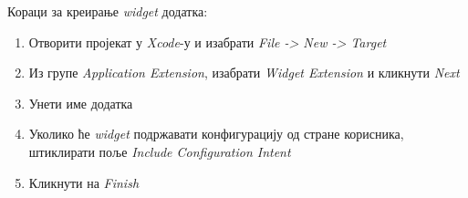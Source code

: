 \documentclass[12pt,oneside]{memoir}
\begin{document}
\indent Кораци за креирање \textit{widget} додатка:
\begin{enumerate}
    \item Отворити пројекат у \textit{Xcode}-у и изабрати \textit{File -> New -> Target}
    \item Из групе \textit{Application Extension}, изабрати \textit{Widget Extension} и кликнути \textit{Next}
    \item Унети име додатка
    \item Уколико ће \textit{widget} подржавати конфигурацију од стране корисника, штиклирати поље \textit{Include Configuration Intent}
    \item Кликнути на \textit{Finish}
\end{enumerate}
\end{document}
